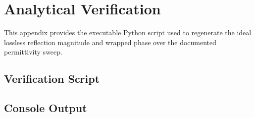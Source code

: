 \chapter{Analytical Verification}
\label{app:analytical-verification}

This appendix provides the executable Python script used to regenerate the ideal
lossless reflection magnitude and wrapped phase over the documented permittivity
sweep.

\section{Verification Script}



\section{Console Output}


